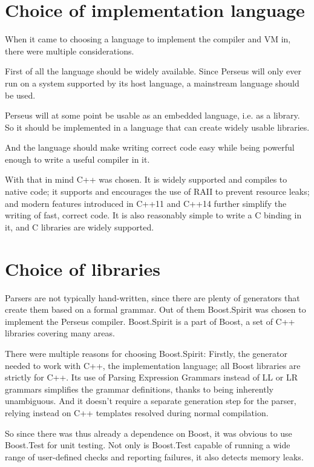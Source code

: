 	\section{Choice of implementation language}
	
		When it came to choosing a language to implement the compiler and VM in, there were multiple considerations.
		
		First of all the language should be widely available. Since Perseus will only ever run on a system supported by its host language, a mainstream language should be used.
		
		Perseus will at some point be usable as an embedded language, i.e. as a library. So it should be implemented in a language that can create widely usable libraries.
		
		And the language should make writing correct code easy while being powerful enough to write a useful compiler in it.
		
		With that in mind C++ was chosen. It is widely supported and compiles to native code; it supports and encourages the use of RAII to prevent resource leaks; and modern features introduced in C++11 and C++14 further simplify the writing of fast, correct code. It is also reasonably simple to write a C binding in it, and C libraries are widely supported.
		
	
	\section{Choice of libraries}
	
		Parsers are not typically hand-written, since there are plenty of generators that create them based on a formal grammar. Out of them Boost.Spirit was chosen to implement the Perseus compiler. Boost.Spirit is a part of Boost, a set of C++ libraries covering many areas.
		
		There were multiple reasons for choosing Boost.Spirit: Firstly, the generator needed to work with C++, the implementation language; all Boost libraries are strictly for C++. Its use of Parsing Expression Grammars instead of LL or LR grammars simplifies the grammar definitions, thanks to being inherently unambiguous. And it doesn't require a separate generation step for the parser, relying instead on C++ templates resolved during normal compilation.
		
		So since there was thus already a dependence on Boost, it was obvious to use Boost.Test for unit testing. Not only is Boost.Test capable of running a wide range of user-defined checks and reporting failures, it also detects memory leaks.
	
